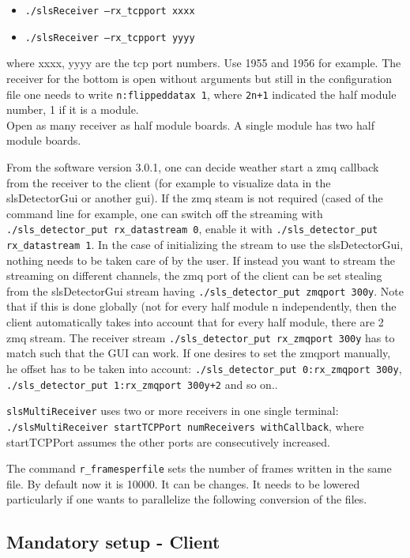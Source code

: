 \documentclass{article}
\begin{document}
\begin{itemize}
\item {\tt{./slsReceiver --rx\_tcpport xxxx}} 
\item {\tt{./slsReceiver --rx\_tcpport yyyy}}
\end{itemize}
where xxxx, yyyy are the tcp port numbers. Use 1955 and 1956 for example. The receiver for the bottom is open without arguments but still in the configuration file one needs to write {\tt{n:flippeddatax 1}}, where {\tt{2n+1}} indicated the half module number, 1 if it is a module.
\\ Open as many receiver as half module boards. A single module has two half module boards.

From the software version 3.0.1, one can decide weather start a zmq callback from the receiver to the client (for example to visualize data in the slsDetectorGui or another gui). If the zmq steam is not required (cased of the command line for example, one can switch off the streaming with {\tt{./sls\_detector\_put rx\_datastream 0}}, enable it with {\tt{./sls\_detector\_put rx\_datastream 1}}. In the case of initializing the stream to use the slsDetectorGui, nothing needs to be taken care of by the user. If instead you want to stream the streaming on different channels, the zmq port of the client can be set stealing from the slsDetectorGui stream having {\tt{./sls\_detector\_put zmqport 300y}}. Note that if this is done globally (not for every half module n independently, then the client automatically takes into account that for every half module, there are 2 zmq stream. The receiver stream {\tt{./sls\_detector\_put rx\_zmqport 300y}} has to match such that the GUI can work. 
If one desires to set the zmqport manually, he offset has to be taken into account: {\tt{./sls\_detector\_put 0:rx\_zmqport 300y}}, {\tt{./sls\_detector\_put 1:rx\_zmqport 300y+2}} and so on..


{\tt{slsMultiReceiver}} uses two or more receivers in one single terminal: {\tt{./slsMultiReceiver startTCPPort numReceivers withCallback}}, where startTCPPort assumes the other ports are consecutively increased.

The command {\tt{r\_framesperfile}} sets the number of frames written in the same file. By default now it is 10000. It can be changes. It needs to be lowered particularly if one wants to parallelize the following conversion of the files. 


\subsection{Mandatory setup - Client}
\end{document}
